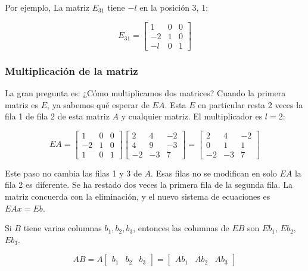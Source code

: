 Por ejemplo, La matriz $E_{31}$ tiene $-l$ en la posición 3, 1:

\begin{equation*}
	E_{31}= \begin{bmatrix}
		1 & 0 & 0 \\ -2& 1& 0 \\ -l &0 &1
	\end{bmatrix}
\end{equation*}

\subsubsection{Multiplicación de la matriz}

La gran pregunta es: ¿Cómo multiplicamos dos matrices? Cuando la primera matriz es $E$,
ya sabemos qué esperar de $EA$. Esta $E$ en particular resta 2 veces la fila 1 de
fila 2 de esta matriz $A$ y cualquier matriz. El multiplicador es $l= 2$:

\begin{equation*}
	EA=\begin{bmatrix}
		1 & 0 & 0 \\ -2& 1& 0 \\ 1&0 &1
	\end{bmatrix} \begin{bmatrix}
		2 & 4 & -2 \\ 4& 9& -3 \\ -2&-3 &7
	\end{bmatrix}= \begin{bmatrix}
		2 & 4 & -2 \\ 0& 1& 1 \\ -2&-3 &7
	\end{bmatrix}
\end{equation*}

Este paso no cambia las filas 1 y 3 de $A$. Esas filas no se modifican en solo $EA$
la fila 2 es diferente. Se ha restado dos veces la primera fila de la segunda fila. La matriz
concuerda con la eliminación, y el nuevo sistema de ecuaciones es $EAx = Eb$.

Si $B$ tiene varias columnas $b_{1}, b_2 , b_{3}$, entonces las columnas de $EB$ son $Eb_{1}$, $Eb_2 $, $Eb_{3}$.

\begin{equation}
	AB=A \begin{bmatrix}
		b_1& b_2& b_{3}
	\end{bmatrix}=\begin{bmatrix}
		Ab_1& Ab_2& Ab_{3}
	\end{bmatrix}
\end{equation}

